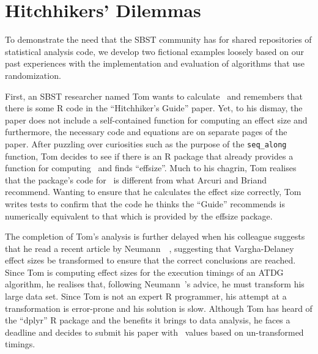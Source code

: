 
\vspace*{-1em}

\section{Hitchhikers' Dilemmas}
\label{sec:dilemma}

To demonstrate the need that the SBST community has for shared repositories of statistical analysis code, we develop two
fictional examples loosely based on our past experiences with the implementation and evaluation of algorithms that use
randomization.

First, an SBST researcher named Tom wants to calculate \atwelve~and remembers that there is some R code in the
``Hitchhiker's Guide'' paper. Yet, to his dismay, the paper does not include a self-contained function for computing an
effect size and furthermore, the necessary code and equations are on separate pages of the paper. After puzzling over
curiosities such as the purpose of the {\tt seq\_along} function, Tom decides to see if there is an R package that
already provides a function for computing \atwelve~and finds ``effsize''. Much to his chagrin, Tom realises that the
package's code for \atwelve~is different from what Arcuri and Briand recommend. Wanting to ensure that he calculates the
effect size correctly, Tom writes tests to confirm that the code he thinks the ``Guide'' recommends is numerically
equivalent to that which is provided by the effsize package.

The completion of Tom's analysis is further delayed when his colleague suggests that he read a recent article by
Neumann~\etal~\cite{Neumann2015}, suggesting that Vargha-Delaney effect sizes be transformed to ensure that the correct
conclusions are reached. Since Tom is computing effect sizes for the execution timings of an ATDG algorithm, he realises
that, following Neumann~\etal's advice, he must transform his large data set. Since Tom is not an expert R programmer,
his attempt at a transformation is error-prone and his solution is slow. Although Tom has heard of the ``dplyr''
R package and the benefits it brings to data analysis, he faces a deadline and decides to submit his paper with
\atwelve~values based on un-transformed timings.

